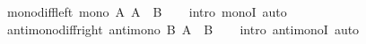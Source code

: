 \begin{isabellebody}
\endisatagproof
{\isafoldproof}%
%
\isadelimproof
\isanewline
%
\endisadelimproof
\isanewline
{}\isamarkupfalse%
\ mono{\isacharunderscore}{\kern0pt}diff{\isacharunderscore}{\kern0pt}left{\isacharcolon}{\kern0pt}\ {\isachardoublequoteopen}mono\ {\isacharparenleft}{\kern0pt}{\isasymlambda}A{\isachardot}{\kern0pt}\ A\ {\isasymsetminus}\ B{\isacharparenright}{\kern0pt}{\isachardoublequoteclose}\isanewline
%
\isadelimproof
\ \ %
\endisadelimproof
%
\isatagproof
{}\isamarkupfalse%
\ {\isacharparenleft}{\kern0pt}intro\ monoI{\isacharparenright}{\kern0pt}\ auto%
\endisatagproof
{\isafoldproof}%
%
\isadelimproof
\isanewline
%
\endisadelimproof
\isanewline
{}\isamarkupfalse%
\ antimono{\isacharunderscore}{\kern0pt}diff{\isacharunderscore}{\kern0pt}right{\isacharcolon}{\kern0pt}\ {\isachardoublequoteopen}antimono\ {\isacharparenleft}{\kern0pt}{\isasymlambda}B{\isachardot}{\kern0pt}\ A\ {\isasymsetminus}\ B{\isacharparenright}{\kern0pt}{\isachardoublequoteclose}\isanewline
%
\isadelimproof
\ \ %
\endisadelimproof
%
\isatagproof
{}\isamarkupfalse%
\ {\isacharparenleft}{\kern0pt}intro\ antimonoI{\isacharparenright}{\kern0pt}\ auto%
\endisatagproof
{\isafoldproof}%
%
\isadelimproof
\isanewline
%
\endisadelimproof
%
\isadelimtheory
\isanewline
%
\endisadelimtheory
%
\isatagtheory
{}\isamarkupfalse%
%
\endisatagtheory
{\isafoldtheory}%
%
\isadelimtheory
%
\endisadelimtheory
%
\end{isabellebody}%
\endinput
